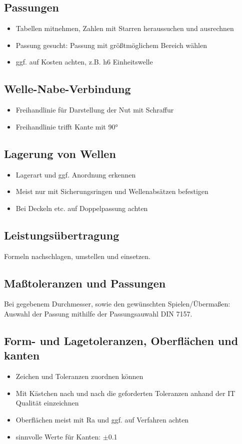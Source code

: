 \documentclass[a4paper,parskip=half*,DIV=7,fontsize=11pt]{scrartcl}
\begin{document}
\subsection{Passungen}
\begin{itemize}
	\item Tabellen mitnehmen, Zahlen mit Starren heraussuchen und ausrechnen
	\item Passung gesucht: Passung mit größtmöglichem Bereich wählen
	\item ggf. auf Kosten achten, z.B. h6 Einheitswelle
\end{itemize}

\subsection{Welle-Nabe-Verbindung}
\begin{itemize}
	\item Freihandlinie für Darstellung der Nut mit Schraffur
	\item Freihandlinie trifft Kante mit 90°
\end{itemize}

\subsection{Lagerung von Wellen}
\begin{itemize}
	\item Lagerart und ggf. Anordnung erkennen
	\item Meist nur mit Sicherungsringen und Wellenabsätzen befestigen
	\item Bei Deckeln etc. auf Doppelpassung achten
\end{itemize}

\subsection{Leistungsübertragung}
	Formeln nachschlagen, umstellen und einsetzen.
	
\subsection{Maßtoleranzen und Passungen}
Bei gegebenem Durchmesser, sowie den gewünschten Spielen/Übermaßen: Auswahl der Passung mithilfe der Passungsauwahl DIN 7157.
	
\subsection{Form- und Lagetoleranzen, Oberflächen und kanten}
\begin{itemize}
	\item Zeichen und Toleranzen zuordnen können
	\item Mit Kästchen nach und nach die geforderten Toleranzen anhand der IT Qualität einzeichnen
	\item Oberflächen meist mit Ra und ggf. auf Verfahren achten
	\item sinnvolle Werte für Kanten: $\pm$0.1
\end{itemize}
	
\end{document}
